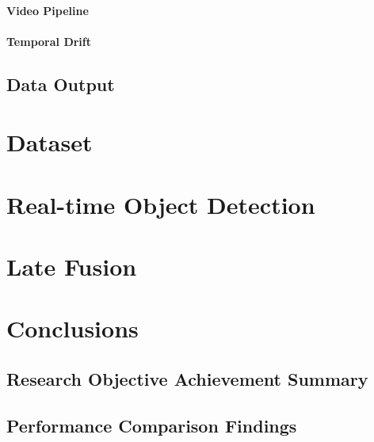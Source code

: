\documentclass{erauthesis}
\begin{document}
            \subsubsection{Video Pipeline}
            
            \subsubsection{Temporal Drift}
            
    \section{Data Output}

\chapter{Dataset}

\chapter{Real-time Object Detection}

\chapter{Late Fusion}

\chapter{Conclusions}


\section{Research Objective Achievement Summary}

\section{Performance Comparison Findings}
\end{document}
